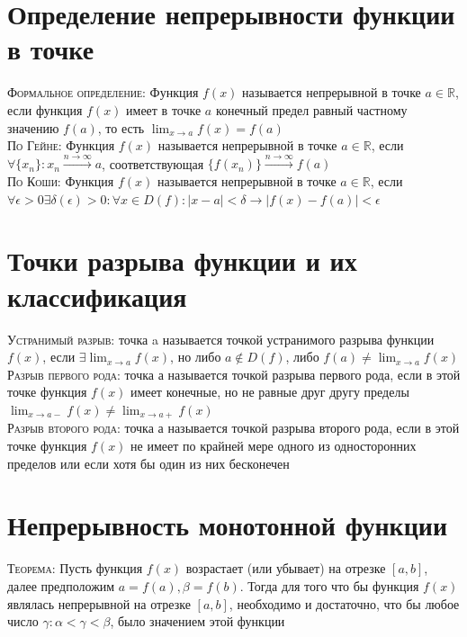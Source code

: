 \documentclass[14pt]{article}
\begin{document}
    \section{Определение непрерывности функции в точке}
        \textsc{Формальное определение:} Функция $f(x)$ называется непрерывной в точке $a \in \mathbb{R}$, если функция $f(x)$ имеет в точке $a$ конечный предел равный частному значению $f(a)$, то есть $\lim_{x \rightarrow a} f(x) = f(a)$ \\
        \textsc{По Гейне:} Функция $f(x)$ называется непрерывной в точке $a \in \mathbb{R}$, если $\forall\{x_n\} : x_n \xrightarrow{n \rightarrow \infty } a $, соответствующая $\{f(x_n)\}  \xrightarrow{n \rightarrow \infty} f(a)$ \\
        \textsc{По Коши:} Функция $f(x)$ называется непрерывной в точке $a \in \mathbb{R}$, если $\forall \epsilon > 0 \exists \delta(\epsilon) > 0: \forall x \in D(f) : |x-a| < \delta \rightarrow |f(x) - f(a)| < \epsilon$

    \section{Точки разрыва функции и их классификация}
        \textsc{Устранимый разрыв:} точка a называется точкой устранимого разрыва функции $f(x)$, если $\exists \lim_{x \rightarrow a} f(x) $, но либо $a\notin D(f)$, либо $f(a) \ne  \lim_{x \rightarrow a} f(x)$ \\
        \textsc{Разрыв первого рода:} точка а называется точкой разрыва первого рода, если в этой точке функция $f(x)$ имеет конечные, но не равные друг другу пределы $\lim_{x \rightarrow a -} f(x) \ne \lim_{x \rightarrow a +} f(x)$ \\ 
        \textsc{Разрыв второго рода:} точка а называется точкой разрыва второго рода, если в этой точке функция $f(x)$ не имеет по крайней мере одного из односторонних пределов или если хотя бы один из них бесконечен

    \section{Непрерывность монотонной функции}
        \textsc{Теорема:} Пусть функция $f(x)$ возрастает (или убывает) на отрезке $[a,b]$, далее предположим $a = f(a), \beta = f(b)$. Тогда для того что бы функция $f(x)$ являлась непрерывной на отрезке $[a,b]$, необходимо и достаточно, что бы любое число $\gamma:\alpha<\gamma<\beta$, было значением этой функции
\end{document}
